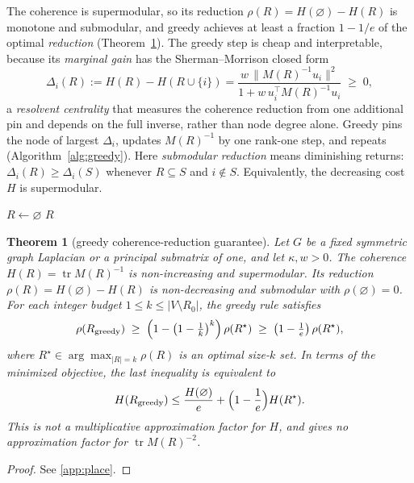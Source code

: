 \documentclass[11pt]{article}
\newtheorem{theorem}{Theorem}
\theoremstyle{definition}
\DeclareMathOperator{\tr}{tr}
\begin{document}
The coherence is supermodular, so its reduction $\rho(R)=H(\varnothing)-H(R)$ is monotone and submodular,
and greedy achieves at least a fraction $1-1/e$ of the optimal \emph{reduction} \cite{Nemhauser}
(Theorem~\ref{thm:place}).
The greedy step is cheap and interpretable, because its \emph{marginal gain} has the Sherman--Morrison
closed form
\begin{equation}\label{eq:marg}
  \Delta_i(R):=H(R)-H(R\cup\{i\})=\frac{w\,\|M(R)^{-1}u_i\|^2}{1+w\,u_i^\top M(R)^{-1}u_i}\;\ge\;0,
\end{equation}
a \emph{resolvent centrality} that measures the coherence reduction from one additional pin and
depends on the full inverse, rather than node degree alone. Greedy pins the node of largest $\Delta_i$, updates
$M(R)^{-1}$ by one rank-one step, and repeats (Algorithm~\ref{alg:greedy}).
Here \emph{submodular reduction} means diminishing returns:
$\Delta_i(R)\ge\Delta_i(S)$ whenever $R\subseteq S$ and $i\notin S$.
Equivalently, the decreasing cost $H$ is supermodular.

\begin{algorithm}[H]
\DontPrintSemicolon
\caption{Greedy corrector placement for problem~\eqref{eq:placeprob}: spend the budget one node at a
time, each step pinning the node of largest marginal gain.}\label{alg:greedy}
$R \leftarrow \varnothing$\;
\Return $R$\;
\end{algorithm}

\begin{theorem}[greedy coherence-reduction guarantee]\label{thm:place}
Let $G$ be a fixed symmetric graph Laplacian or a principal submatrix of one, and let $\kappa,w>0$.
The coherence $H(R)=\tr M(R)^{-1}$ is non-increasing and supermodular. Its reduction
$\rho(R)=H(\varnothing)-H(R)$ is non-decreasing and submodular with $\rho(\varnothing)=0$.
For each integer budget $1\le k\le |V\setminus R_0|$, the greedy rule satisfies
\begin{equation}\label{eq:greedybound}
  \rho(R_{\mathrm{greedy}})\;\ge\;\Bigl(1-\bigl(1-\tfrac1k\bigr)^{k}\Bigr)\,\rho(R^\star)\;\ge\;\bigl(1-\tfrac1e\bigr)\,\rho(R^\star),
\end{equation}
where $R^\star\in\arg\max_{|R|=k}\rho(R)$ is an optimal size-$k$ set. In terms of the minimized
objective, the last inequality is equivalent to
\[
  H(R_{\mathrm{greedy}})\le\frac{H(\varnothing)}{e}
       +\Bigl(1-\frac1e\Bigr)H(R^\star).
\]
This is not a multiplicative approximation factor for $H$, and gives no approximation factor
for $\tr M(R)^{-2}$.
\end{theorem}
\begin{proof}
See \ref{app:place}.
\end{proof}
\end{document}
